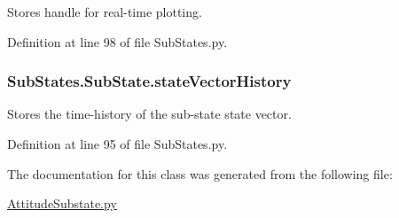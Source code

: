 Stores handle for real-\/time plotting. 



Definition at line 98 of file Sub\+States.\+py.

\subsubsection[{\texorpdfstring{state\+Vector\+History}{stateVectorHistory}}]{\setlength{\rightskip}{0pt plus 5cm}Sub\+States.\+Sub\+State.\+state\+Vector\+History\hspace{0.3cm}{\ttfamily [inherited]}}\hypertarget{classSubStates_1_1SubState_a24bf2de56fc3037d91cba43d28f3bf60}{}\label{classSubStates_1_1SubState_a24bf2de56fc3037d91cba43d28f3bf60}


Stores the time-\/history of the sub-\/state state vector. 



Definition at line 95 of file Sub\+States.\+py.



The documentation for this class was generated from the following file\+:\begin{DoxyCompactItemize}
\item 
\hyperlink{AttitudeSubstate_8py}{Attitude\+Substate.\+py}\end{DoxyCompactItemize}
